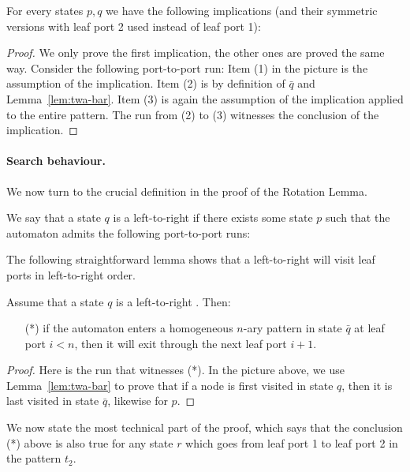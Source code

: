 \begin{lemma}\label{lem:closure-up} For every states $p,q$ we have the following implications (and their symmetric versions with leaf port 2 used instead of leaf port 1):
\end{lemma}
\begin{proof}
We only prove the first implication, the other ones are proved the same way.
Consider the following port-to-port run:
Item (1) in the picture is  the assumption of the implication. Item (2) is by definition of $\bar q$ and Lemma~\ref{lem:twa-bar}. Item (3) is again the assumption of the implication applied to the entire pattern. The run from (2) to (3) witnesses the conclusion of the implication. \end{proof}

\paragraph*{Search behaviour.} We now turn to the crucial definition in the proof of the Rotation Lemma. 

\begin{definition}
We say that a state $q$ is a left-to-right \dfs if there exists some state $p$ such  that the automaton admits the following port-to-port runs:
\end{definition}
The following straightforward lemma shows that a left-to-right \dfs will visit leaf ports in left-to-right order.
\begin{lemma}\label{lem:dfs-does}
Assume that a state $q$ is a left-to-right \dfs. Then:
\begin{itemize}
	\item[(*)]if  the automaton enters a homogeneous $n$-ary pattern in state $\bar q$ at  leaf port $i<n$, then it will exit through the next leaf port $i+1$.
\end{itemize}
\end{lemma}
\begin{proof}
Here is the run that witnesses (*).
In the picture above, we use Lemma~\ref{lem:twa-bar} to prove that if a node is first visited in state $q$, then it is last visited in state $\bar q$, likewise for $p$. 
\end{proof}
We now state the most technical part of the proof, which says that the conclusion (*) above is also true for any state $r$ which goes from leaf port 1 to leaf port 2 in the pattern $t_2$.

